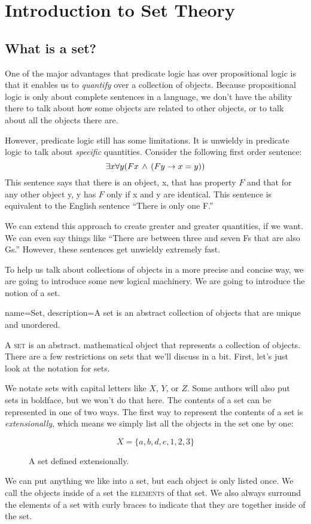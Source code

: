 \chapter{Introduction to Set Theory}
\label{ch:introsettheory}
\setlength{\parindent}{1em}

\section{What is a set?}

One of the major advantages that predicate logic has over propositional logic is that it enables us to \emph{quantify} over a collection of objects. Because propositional logic is only about complete sentences in a language, we don't have the ability there to talk about how some objects are related to other objects, or to talk about all the objects there are.

However, predicate logic still has some limitations. It is unwieldy in predicate logic to talk about \emph{specific} quantities. Consider the following first order sentence:
\[\exists x \forall y (Fx \,\land\, (Fy \rightarrow x=y))\]
This sentence says that there is an object, x, that has property $F$ and that for any other object y, y has $F$ only if x and y are identical. This sentence is equivalent to the English sentence ``There is only one F.''

We can extend this approach to create greater and greater quantities, if we want. We can even say things like ``There are between three and seven Fs that are also Gs.'' However, these sentences get unwieldy extremely fast.

To help us talk about collections of objects in a more precise and concise way, we are going to introduce some new logical machinery. We are going to introduce the notion of a set.

{
name=Set,
description={A set is an abstract collection of objects that are unique and unordered.}
}

A \textsc{\gls{set}} is an abstract. mathematical object that represents a collection of objects. There are a few restrictions on sets that we'll discuss in a bit. First, let's just look at the notation for sets.

We notate sets with capital letters like $X$, $Y$, or $Z$. Some authors will also put sets in boldface, but we won't do that here. The contents of a set can be represented in one of two ways. The first way to represent the contents of a set is \emph{extensionally}, which means we simply list all the objects in the set one by one:
\begin{figure}
\[X=\{a,b,d,e,1,2,3\}\]
	\caption{A set defined extensionally.}
	\label{fig:setextension}
\end{figure}
We can put anything we like into a set, but each object is only listed once. We call the objects inside of a set the \textsc{\glspl{element}} of that set. We also always surround the elements of a set with curly braces to indicate that they are together inside of the set.

